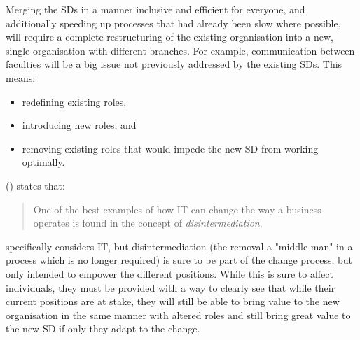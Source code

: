 Merging the SDs in a manner inclusive and efficient for everyone, and additionally speeding up processes that had already been slow where possible, will require a complete restructuring of the existing organisation into a new, single organisation with different branches. For example, communication between faculties will be a big issue not previously addressed by the existing SDs. This means:

\begin{itemize}
  \item redefining existing roles,
  \item introducing new roles, and
  \item removing existing roles that would impede the new SD from working optimally.
\end{itemize}

\citeauthor{luftman:managing-the-information-technology-resource:2009} (\citeyear[1232]{luftman:managing-the-information-technology-resource:2009}) states that:

\begin{quote}
    One of the best examples of how IT can change the way a business operates is found in the concept of \textit{disintermediation}.
\end{quote}

\citeauthor{luftman:managing-the-information-technology-resource:2009} specifically considers IT, but disintermediation (the removal a "middle man" in a process which is no longer required) is sure to be part of the change process, but only intended to empower the different positions. While this is sure to affect individuals, they must be provided with a way to clearly see that while their current positions are at stake, they will still be able to bring value to the new organisation in the same manner with altered roles and still bring great value to the new SD if only they adapt to the change.
